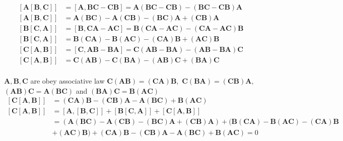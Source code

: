 \documentclass{article}
\begin{document}
\begin{flushleft}
$$
\begin{aligned}
[\mathbf{A}[\mathbf{B}, \mathbf{C}]]&=[\mathbf{A}, \mathbf{B} \mathbf{C}-\mathbf{C} \mathbf{B}]=\mathbf{A}(\mathbf{B} \mathbf{C}-\mathbf{C} \mathbf{B})-(\mathbf{B} \mathbf{C}-\mathbf{C} \mathbf{B}) \mathbf{A} \\
[\mathbf{A}[\mathbf{B}, \mathbf{C}]]&=\mathbf{A}(\mathbf{B} \mathbf{C})-\mathbf{A}(\mathbf{C} \mathbf{B})-(\mathbf{B} \mathbf{C}) \mathbf{A}+(\mathbf{C} \mathbf{B}) \mathbf{A} \\
[\mathbf{B}[\mathbf{C}, \mathbf{A}]]&=[\mathbf{B}, \mathbf{C} \mathbf{A}-\mathbf{A} \mathbf{C}]=\mathbf{B}(\mathbf{C A}-\mathbf{A} \mathbf{C})-(\mathbf{C A}-\mathbf{A} \mathbf{C}) \mathbf{B} \\
[\mathbf{B}[\mathbf{C}, \mathbf{A}]]&=\mathbf{B}(\mathbf{C} \mathbf{A})-\mathbf{B}(\mathbf{A} \mathbf{C})-(\mathbf{C} \mathbf{A}) \mathbf{B}+(\mathbf{A} \mathbf{C}) \mathbf{B} \\
[\mathbf{C}[\mathbf{A}, \mathbf{B}]]&=[\mathbf{C}, \mathbf{A} \mathbf{B}-\mathbf{B} \mathbf{A}]=\mathbf{C}(\mathbf{A} \mathbf{B}-\mathbf{B} \mathbf{A})-(\mathbf{A} \mathbf{B}-\mathbf{B} \mathbf{A}) \mathbf{C} \\
[\mathbf{C}[\mathbf{A}, \mathbf{B}]]&=\mathbf{C}(\mathbf{A} \mathbf{B})-\mathbf{C}(\mathbf{B} \mathbf{A})-(\mathbf{A} \mathbf{B}) \mathbf{C}+(\mathbf{B} \mathbf{A}) \mathbf{C} \\
\end{aligned}
$$

$\mathbf{A}, \mathbf{B}, \mathbf{C}$ are obey associative law $ \mathbf{C}(\mathbf{A} \mathbf{B})=(\mathbf{C} \mathbf{A}) \mathbf{B},$ $\mathbf{C}(\mathbf{B} \mathbf{A})=(\mathbf{C} \mathbf{B}) \mathbf{A},$ $(\mathbf{A} \mathbf{B}) \mathbf{C}=\mathbf{A}(\mathbf{B} \mathbf{C})$ and $(\mathbf{B} \mathbf{A}) \mathbf{C}=\mathbf{B}(\mathbf{A} \mathbf{C})$
$$
\begin{aligned}
[\mathbf{C}[\mathbf{A}, \mathbf{B}]]&=(\mathbf{C} \mathbf{A}) \mathbf{B}-(\mathbf{C} \mathbf{B}) \mathbf{A}-\mathbf{A}(\mathbf{B} \mathbf{C})+\mathbf{B}(\mathbf{A} \mathbf{C}) \\
[\mathbf{C}[\mathbf{A}, \mathbf{B}]]&=[\mathbf{A},[\mathbf{B}, \mathbf{C}]]+[\mathbf{B}[\mathbf{C}, \mathbf{A}]]+[\mathbf{C}[\mathbf{A}, \mathbf{B}]] \\
&=(\mathbf{A}(\mathbf{B} \mathbf{C})-\mathbf{A}(\mathbf{C} \mathbf{B})-(\mathbf{B} \mathbf{C}) \mathbf{A}+(\mathbf{C} \mathbf{B}) \mathbf{A})+(\mathbf{B}(\mathbf{C} \mathbf{A})-\mathbf{B}(\mathbf{A} \mathbf{C})-(\mathbf{C} \mathbf{A}) \mathbf{B} \\
&+(\mathbf{A} \mathbf{C}) \mathbf{B})+(\mathbf{C} \mathbf{A}) \mathbf{B}-(\mathbf{C} \mathbf{B}) \mathbf{A}-\mathbf{A}(\mathbf{B} \mathbf{C})+\mathbf{B}(\mathbf{A} \mathbf{C})=0
\end{aligned}
$$


\end{flushleft}
\end{document}
